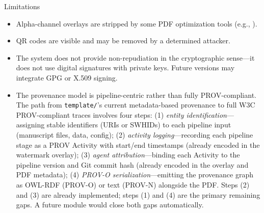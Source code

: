 \documentclass[
  ignorenonframetext,
]{beamer}
\providecommand{\tightlist}{%
  \setlength{\itemsep}{0pt}\setlength{\parskip}{0pt}}
\begin{document}
\begin{frame}{Limitations}
\protect{}\label{limitations}
\begin{itemize}
\tightlist
\item
  Alpha-channel overlays are stripped by some PDF optimization tools
  (e.g., ).
\item
  QR codes are visible and may be removed by a determined attacker.
\item
  The system does not provide non-repudiation in the cryptographic
  sense---it does not use digital signatures with private keys. Future
  versions may integrate GPG or X.509 signing.
\item
  The provenance model is pipeline-centric rather than fully
  PROV-compliant. The path from \texttt{template/}'s current
  metadata-based provenance to full W3C PROV-compliant traces involves
  four steps: (1) \emph{entity identification}---assigning stable
  identifiers (URIs or SWHIDs) to each pipeline input (manuscript files,
  data, config); (2) \emph{activity logging}---recording each pipeline
  stage as a PROV Activity with start/end timestamps (already encoded in
  the watermark overlay); (3) \emph{agent attribution}---binding each
  Activity to the pipeline version and Git commit hash (already encoded
  in the overlay and PDF metadata); (4) \emph{PROV-O
  serialization}---emitting the provenance graph as OWL-RDF (PROV-O) or
  text (PROV-N) alongside the PDF. Steps (2) and (3) are already
  implemented; steps (1) and (4) are the primary remaining gaps. A
  future  module would close both gaps
  automatically.
\end{itemize}
\end{frame}
\end{document}
